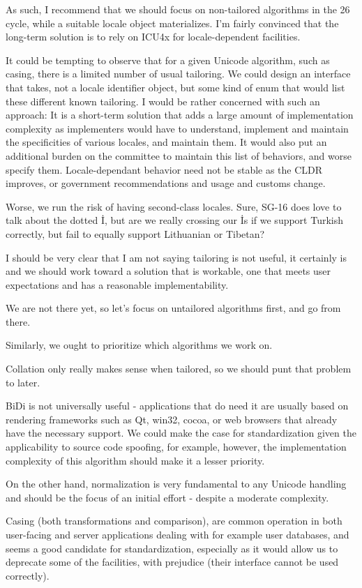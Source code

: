 \documentclass{wg21}
\begin{document}
As such, I recommend that we should focus on non-tailored algorithms in the 26 cycle, while a suitable locale object materializes.
I'm fairly convinced that the long-term solution is to rely on ICU4x for locale-dependent facilities.

It could be tempting to observe that for a given Unicode algorithm, such as casing, there is a limited number of usual tailoring.
We could design an interface that takes, not a locale identifier object, but some kind of enum that would list these different known tailoring.
I would be rather concerned with such an approach: It is a short-term solution that adds a large amount of implementation complexity as implementers would have to understand, implement and maintain the specificities of various locales, and maintain them.
It would also put an additional burden on the committee to maintain this list of behaviors, and worse specify them. Locale-dependant behavior need not be stable as
the CLDR improves, or government recommendations and usage and customs change.

Worse, we run the risk of having second-class locales. Sure, SG-16 does love to talk about the dotted İ, but are we really crossing our İs if we support Turkish correctly, but fail to equally support Lithuanian or Tibetan?

I should be very clear that I am not saying tailoring is not useful, it certainly is and we should work toward a solution that is workable, one that meets user expectations and has a reasonable implementability.

We are not there yet, so let's focus on untailored algorithms first, and go from there.

Similarly, we ought to prioritize which algorithms we work on.

Collation only really makes sense when tailored, so we should punt that problem to later.

BiDi is not universally useful - applications that do need it are usually based on rendering frameworks such as Qt, win32, cocoa, or web browsers that already have the necessary support.
We could make the case for standardization given the applicability to source code spoofing, for example, however, the implementation complexity of this algorithm should make it a lesser priority.

On the other hand, normalization is very fundamental to any Unicode handling and should be the focus of an initial effort - despite a moderate complexity.

Casing (both transformations and comparison), are common operation in both user-facing and server applications dealing with for example user databases, and seems a good candidate for standardization, especially as it would allow us to deprecate some of the  facilities, with prejudice (their interface cannot be used correctly).
\end{document}
